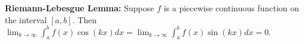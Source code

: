 {\bf Riemann-Lebesgue Lemma:} Suppose $f$ is a piecewise continuous function on the interval $[a,b]$. Then $\lim_{k\rightarrow\infty}\int_a^bf(x)\cos(kx)dx=\lim_{k\rightarrow\infty}\int_a^bf(x)\sin(kx)dx=0$.